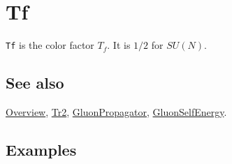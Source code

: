 \documentclass[../FeynCalcManual.tex]{subfiles}
\begin{document}
\hypertarget{tf}{
\section{Tf}\label{tf}}

\texttt{Tf} is the color factor \(T_f\). It is \(1/2\) for \(SU(N)\).

\subsection{See also}

\hyperlink{toc}{Overview}, \hyperlink{tr2}{Tr2},
\hyperlink{gluonpropagator}{GluonPropagator},
\hyperlink{gluonselfenergy}{GluonSelfEnergy}.

\subsection{Examples}
\end{document}
